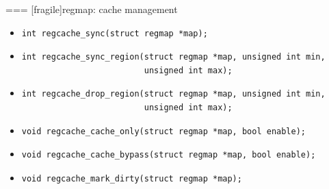 === [fragile]{regmap: cache management}
  \begin{itemize}
    \item
      \begin{block}{}
        \begin{verbatim}
int regcache_sync(struct regmap *map);
        \end{verbatim}
      \end{block}
    \item 
      \begin{block}{}
        \begin{verbatim}
int regcache_sync_region(struct regmap *map, unsigned int min,
                         unsigned int max);
        \end{verbatim}
      \end{block}
    \item 
      \begin{block}{}
        \begin{verbatim}
int regcache_drop_region(struct regmap *map, unsigned int min,
                         unsigned int max);
        \end{verbatim}
      \end{block}
    \item 
      \begin{block}{}
        \begin{verbatim}
void regcache_cache_only(struct regmap *map, bool enable);
        \end{verbatim}
      \end{block}
    \item 
      \begin{block}{}
        \begin{verbatim}
void regcache_cache_bypass(struct regmap *map, bool enable);
        \end{verbatim}
      \end{block}
    \item 
      \begin{block}{}
        \begin{verbatim}
void regcache_mark_dirty(struct regmap *map);
        \end{verbatim}
      \end{block}
  \end{itemize}


